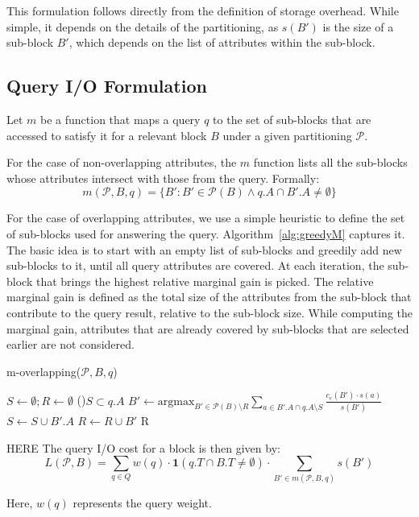 This formulation follows directly from the definition of storage overhead.
While simple, it depends on the details of the partitioning, as $s(B')$ is the
size of a sub-block $B'$, which depends on the list of attributes within the
sub-block.

\subsection{Query I/O Formulation}
\noindent
Let $m$ be a function that maps a query $q$ to the set of sub-blocks that are
accessed to satisfy it for a relevant block $B$ under a given partitioning
$\mathcal{P}$. 

For the case of non-overlapping attributes, the $m$ function lists all the 
sub-blocks whose attributes intersect with those from the query. Formally:
\begin{equation}
m(\mathcal{P}, B, q) = \{B': B'\in \mathcal{P}(B) \wedge q.A \cap B'.A \ne \emptyset\}  
\end{equation}

For the case of overlapping attributes, we use a simple heuristic to define the
set of sub-blocks used for answering the query. Algorithm~\ref{alg:greedyM}
captures it. The basic idea is to start with an empty list of sub-blocks and
greedily add new sub-blocks to it, until all query attributes are covered.  At
each iteration, the sub-block that brings the highest relative marginal gain
is  picked. The relative marginal gain is defined as  the total size of the
attributes from the sub-block that contribute to the query result, relative to
the sub-block size. While computing the marginal gain, attributes that are
already covered by sub-blocks that are selected earlier are not considered.

%
\begin{algorithm}[ht]
\scriptsize
\caption{m-overlapping($\mathcal{P}, B, q$)}
\label{alg:greedyM}
$S\leftarrow \emptyset; R\leftarrow \emptyset$ 
\While(){$S \subset q.A$}{
  $B' \leftarrow \mbox{argmax}_{B'\in\mathcal{P}(B)\setminus R} \sum_{a\in B'.A \cap q.A \setminus S} \frac{c_e(B') \cdot s(a)}{s(B')}$
  $S \leftarrow S \cup B'.A$
  $R\leftarrow R \cup B'$
}
\Return R 
\end{algorithm} 

HERE
The query I/O cost for a block is then given by:
\begin{equation}
L(\mathcal{P}, B) = \sum_{q\in Q} w(q)\cdot\mathbf{1}(q.T \cap B.T \neq \emptyset) \cdot \sum_{B'\in m(\mathcal{P}, B, q)} \!\!s(B')
\end{equation}

Here, $w(q)$ represents the query weight.


